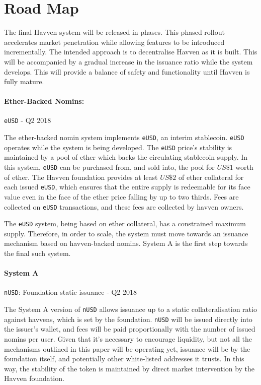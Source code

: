 \section{Road Map}

The final Havven system will be released in phases. This phased rollout 
accelerates market penetration while allowing
features to be introduced incrementally. The intended approach  
is to decentralise Havven as it is built. This will be accompanied by a gradual
increase in the issuance ratio while the system develops.
This will provide a balance of safety and functionality until Havven is fully mature.

\paragraph{Ether-Backed Nomins:} \texttt{eUSD} - Q2 2018

The ether-backed nomin system implements \texttt{eUSD}, an interim stablecoin.
\texttt{eUSD} operates while the system is being developed.
The \texttt{eUSD} price's stability is maintained by a pool of ether which
backs the circulating stablecoin supply. In this system, \texttt{eUSD} can be
purchased from, and sold into, the pool for \(US\$1\) worth of ether.
The Havven foundation provides at least \(US\$2\) of ether collateral for each
issued \texttt{eUSD}, which ensures that the entire supply is redeemable for its
face value even in the face of the ether price falling by up to two thirds.
Fees are collected on \texttt{eUSD} transactions, and these fees are collected
by havven owners.

The \texttt{eUSD} system, being based on ether collateral, has a constrained maximum supply.
Therefore, in order to scale, the system must move towards an issuance mechanism based on havven-backed
nomins. System A is the first step towards the final such system.


\paragraph{System A} \texttt{nUSD}: Foundation static issuance - Q2 2018

The System A version of \texttt{nUSD} allows issuance up to a static
collateralisation ratio against havvens, which is set by the foundation.
\texttt{nUSD} will be issued directly into the issuer's wallet, and fees will be paid
proportionally with the number of issued nomins per user. Given that it's necessary to
encourage liquidity, but not all the mechanisms outlined in this paper will be operating
yet, issuance will be by the foundation itself, and potentially other white-listed
addresses it trusts. In this way, the stability of the token is maintained by direct
market intervention by the Havven foundation.

